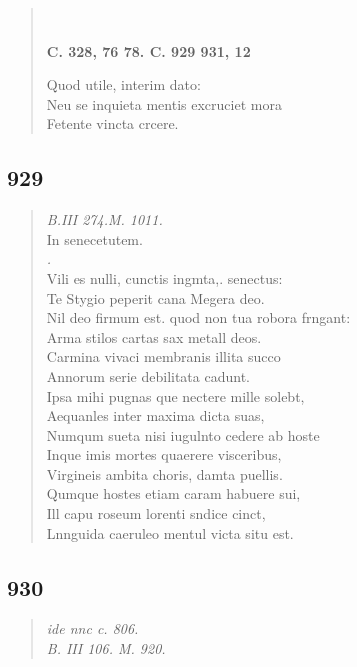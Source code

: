\documentclass[11pt, a4paper]{report}
\begin{document}
\begin{verse}
        ﻿\pagebreak 
    \begin{center} \textbf{C. 328, 76 78. C. 929 931, 12} \end{center} \marginpar{[352]} Quod utile, interim dato: \\ Neu se inquieta mentis excruciet mora \\ Fetente vincta crcere. \\ 
      \end{verse}
  
            \subsection*{929}
      \begin{verse}
      \textit{B.III 274.M. 1011.} \\ In senecetutem. \\ \textit{.} \\ Vili es nulli, cunctis ingmta,. senectus: \\ Te Stygio peperit cana Megera deo. \\ Nil deo firmum est. quod non tua robora frngant: \\ Arma stilos cartas sax metall deos. \\ Carmina vivaci membranis illita succo \\ Annorum serie debilitata cadunt. \\ Ipsa mihi pugnas que nectere mille solebt, \\ Aequanles inter maxima dicta suas, \\ Numqum sueta nisi iugulnto cedere ab hoste \\ Inque imis mortes quaerere visceribus, \\ Virgineis ambita choris, damta puellis. \\ Qumque hostes etiam caram habuere sui, \\ Ill capu roseum lorenti sndice cinct, \\ Lnnguida caeruleo mentul victa situ est. \\ 
      \end{verse}
  
            \subsection*{930}
      \begin{verse}
      \textit{ide nnc c. 806.} \\ \textit{B. III 106. M. 920.} \\ 
      \end{verse}
  
\end{document}
